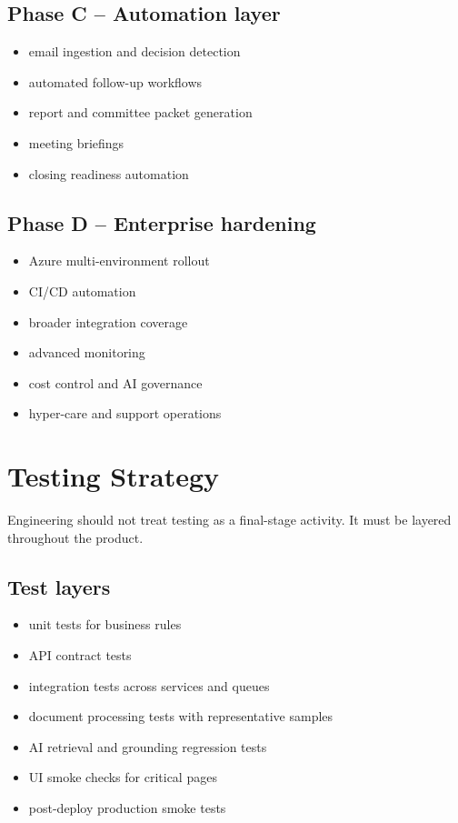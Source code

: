 \documentclass[11pt]{article}
\begin{document}
\subsection{Phase C -- Automation layer}

\begin{itemize}
\item email ingestion and decision detection
\item automated follow-up workflows
\item report and committee packet generation
\item meeting briefings
\item closing readiness automation
\end{itemize}

\subsection{Phase D -- Enterprise hardening}

\begin{itemize}
\item Azure multi-environment rollout
\item CI/CD automation
\item broader integration coverage
\item advanced monitoring
\item cost control and AI governance
\item hyper-care and support operations
\end{itemize}

\section{Testing Strategy}

Engineering should not treat testing as a final-stage activity. It must be layered throughout the product.

\subsection{Test layers}

\begin{itemize}
\item unit tests for business rules
\item API contract tests
\item integration tests across services and queues
\item document processing tests with representative samples
\item AI retrieval and grounding regression tests
\item UI smoke checks for critical pages
\item post-deploy production smoke tests
\end{itemize}
\end{document}

